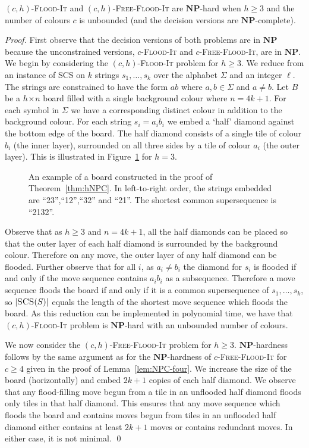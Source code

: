 \documentclass[a4paper,11pt]{llncs}
\newcommand{\pgfgraphic}[1]{}
\newcounter{l}
\renewcommand{\geq}{\geqslant}
\newcommand{\NPtime}{\ensuremath{\mathbf{NP}}}
\newcommand{\Coloroid}[1]{$#1$-\textsc{Flood-It}}
\newcommand{\ColoroidFree}[1]{$#1$-\textsc{Free-Flood-It}}
\newcommand{\SCS}{\textsc{SCS}}
\newcommand{\recdim}[2]{$#1$$\mspace{1mu}$$\times$$\mspace{1mu}$$#2$}
\begin{document}
\begin{theorem}
    \label{thm:hNPC}
     \Coloroid{(c,h)} and \ColoroidFree{(c,h)} are \NPtime-hard when $h\geq 3$ and the number of colours $c$ is unbounded (and the decision versions are \NPtime-complete).
\end{theorem}
\begin{proof}
First observe that the decision versions of both problems are in \NPtime{} because the unconstrained versions, \Coloroid{c} and \ColoroidFree{c}, are in \NPtime{}. We begin by considering the \Coloroid{(c,h)} problem for $h \geq 3$. We reduce from an instance of \SCS{} on $k$ strings $s_1,\dots,s_k$ over the alphabet $\Sigma$ and an integer $\ell$. The strings are constrained to have the form $ab$ where $a,b \in \Sigma$ and $a \neq b$. Let $B$ be a \recdim{h}{n} board filled with a single background colour where $n=4k+1$. For each symbol in $\Sigma$ we have a corresponding distinct colour in addition to the background colour. For each string $s_i = a_ib_i$ we embed a `half' diamond against the bottom edge of the board. The half diamond consists of a single tile of colour $b_i$ (the inner layer), surrounded on all three sides by a tile of colour $a_i$ (the outer layer). This is illustrated in Figure~\ref{fig:height3} for $h=3$.

\begin{figure}[t]
    \centering
	\pgfgraphic{graphic-height3}
    \caption{An example of a board constructed in the proof of Theorem~\ref{thm:hNPC}. In left-to-right order, the strings embedded are ``23'',``12'',``32'' and ``21''. The shortest common supersequence is ``2132''.}
    \label{fig:height3}
\end{figure}

Observe that as $h \geq 3$ and $n=4k+1$, all the half diamonds can be placed so that the outer layer of each half diamond is surrounded by the background colour. Therefore on any move, the outer layer of any half diamond can be flooded. Further observe that for all $i$, as $a_i \neq b_i$ the diamond for $s_i$ is flooded if and only if the move sequence contains $a_ib_i$ as a subsequence. Therefore a move sequence floods the board if and only if it is a common supersequence of $s_1,\dots,s_k$, so $|\SCS{(S)}|$ equals the length of the shortest move sequence which floods the board. As this reduction can be implemented in polynomial time, we have that \Coloroid{(c,h)} problem is \NPtime-hard with an unbounded number of colours.

We now consider the \ColoroidFree{(c,h)} problem for $h \geq 3$. \NPtime-hardness follows by the same argument as for the \NPtime-hardness of \ColoroidFree{c} for $c \geq 4$ given in the proof of Lemma~\ref{lem:NPC-four}. We increase the size of the board (horizontally) and embed $2k+1$ copies of each half diamond. We observe that any flood-filling move begun from a tile in an unflooded half diamond floods only tiles in that half diamond. This ensures that any move sequence which floods the board and contains moves begun from tiles in an unflooded half diamond either contains at least $2k+1$ moves or contains redundant moves. In either case, it is not minimal. \qed
\end{proof}
\end{document}

